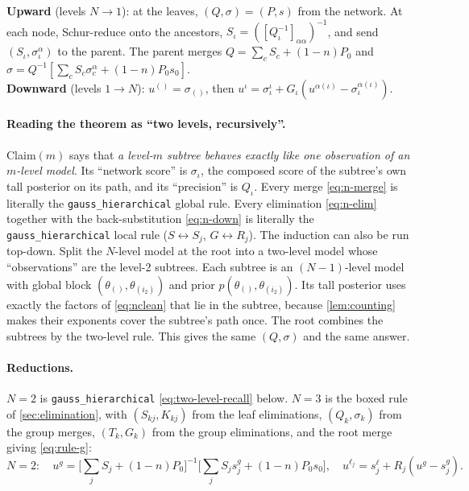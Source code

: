 \documentclass[11pt]{article}
\theoremstyle{definition}
\theoremstyle{remark}
\newcommand{\arrowm}{\texttt{gauss\_\allowbreak hierarchical}}
\begin{document}
\begin{tcolorbox}[colback=blue!3,colframe=blue!40!black,title={$N$-level composed score}]
\textbf{Upward} (levels $N\to1$): at the leaves, $(Q,\sigma)=(P,s)$ from the network.
At each node, Schur-reduce onto the ancestors, $S_\iota=([Q_\iota^{-1}]_{\alpha\alpha})^{-1}$,
and send $(S_\iota,\sigma_\iota^\alpha)$ to the parent. The parent merges
$Q=\sum_cS_c+(1-n)P_0$ and $\sigma=Q^{-1}[\sum_cS_c\sigma_c^\alpha+(1-n)P_0s_0]$.\\[2pt]
\textbf{Downward} (levels $1\to N$): $u^{()}=\sigma_{()}$, then
$u^\iota=\sigma_\iota^\iota+G_\iota(u^{\alpha(\iota)}-\sigma_\iota^{\alpha(\iota)})$.
\end{tcolorbox}

\paragraph{Reading the theorem as ``two levels, recursively''.}
Claim$(m)$ says that \emph{a level-$m$ subtree behaves exactly like one
observation of an $m$-level model}. Its ``network score'' is $\sigma_\iota$, the
composed score of the subtree's own tall posterior on its path, and its
``precision'' is $Q_\iota$. Every merge \eqref{eq:n-merge} is literally the
\arrowm{} global rule. Every elimination \eqref{eq:n-elim} together with the
back-substitution \eqref{eq:n-down} is literally the \arrowm{} local rule
($S\leftrightarrow S_j$, $G\leftrightarrow R_j$). The induction can also be run
top-down. Split the $N$-level model at the root into a two-level model whose
``observations'' are the level-2 subtrees. Each subtree is an $(N-1)$-level model
with global block $(\theta_{()},\theta_{(i_2)})$ and prior
$p(\theta_{()},\theta_{(i_2)})$. Its tall posterior uses exactly the factors of
\eqref{eq:nclean} that lie in the subtree, because \cref{lem:counting} makes their
exponents cover the subtree's path once. The root combines the subtrees by the
two-level rule. This gives the same $(Q,\sigma)$ and the same answer.

\paragraph{Reductions.} $N=2$ is \arrowm{} \eqref{eq:two-level-recall} below.
$N=3$ is the boxed rule of \cref{sec:elimination}, with $(S_{kj},K_{kj})$ from the
leaf eliminations, $(Q_k,\sigma_k)$ from the group merges, $(T_k,G_k)$ from the group
eliminations, and the root merge giving \eqref{eq:rule-g}:
\begin{equation}\label{eq:two-level-recall}
N=2:\quad u^g=\Big[\sum_jS_j+(1-n)P_0\Big]^{-1}\Big[\sum_jS_js^g_j+(1-n)P_0s_0\Big],\quad u^{\ell_j}=s^\ell_j+R_j(u^g-s^g_j).
\end{equation}
\end{document}
